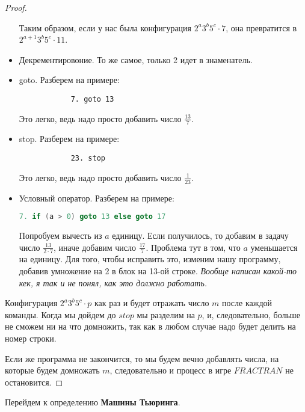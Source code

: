 \begin{proof}
\begin{itemize}
        Таким образом, если у нас была конфигурация $2^a3^b5^c \cdot 7$, она превратится в $2^{a+1}3^b5^c \cdot 11$.
        \item Декрементировоние. То же самое, только 2 идет в знаменатель.
        \item goto. Разберем на примере: \begin{lstlisting}
            7. goto 13
        \end{lstlisting}
        Это легко, ведь надо просто добавить число $\frac{13}{7}$.
        \item stop. Разберем на примере: \begin{lstlisting}
            23. stop
        \end{lstlisting}
        Это легко, ведь надо просто добавить число $\frac{1}{23}$.
        \item Условный оператор. Разберем на примере: \begin{lstlisting}[language=c++]
            7. if (a > 0) goto 13 else goto 17
        \end{lstlisting}
        Попробуем вычесть из $a$ единицу. Если получилось, то добавим в задачу число $\frac{13}{2 \cdot 7}$, иначе добавим число $\frac{17}{7}$. Проблема тут в том, что $a$ уменьшается на единицу. Для того, чтобы исправить это, изменим нашу программу, добавив умножение на 2 в блок на 13-ой строке.
        \textit{Вообще написан какой-то кек, я так и не понял, как это должно работать.}
    \end{itemize}
    Конфигурация $2^a3^b5^c \cdot p$ как раз и будет отражать число $m$ после каждой команды. Когда мы дойдем до $stop$ мы разделим на $p$, и, следовательно, больше не сможем ни на что домножить, так как в любом случае надо будет делить на номер строки. 

    Если же программа не закончится, то мы будем вечно добавлять числа, на которые будем домножать $m$, следовательно и процесс в игре $FRACTRAN$ не остановится. 
\end{proof}

\vspace{5mm}

Перейдем к определению \textbf{Машины Тьюринга}.

